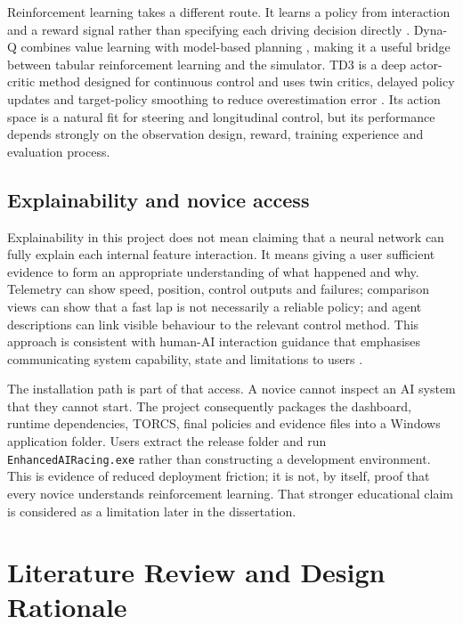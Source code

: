 Reinforcement learning takes a different route. It learns a policy from interaction and a reward signal rather than specifying each driving decision directly \parencite{suttonbarto2018}. Dyna-Q combines value learning with model-based planning \parencite{sutton1990}, making it a useful bridge between tabular reinforcement learning and the simulator. TD3 is a deep actor-critic method designed for continuous control and uses twin critics, delayed policy updates and target-policy smoothing to reduce overestimation error \parencite{fujimoto2018}. Its action space is a natural fit for steering and longitudinal control, but its performance depends strongly on the observation design, reward, training experience and evaluation process.

\subsection{Explainability and novice access}

Explainability in this project does not mean claiming that a neural network can fully explain each internal feature interaction. It means giving a user sufficient evidence to form an appropriate understanding of what happened and why. Telemetry can show speed, position, control outputs and failures; comparison views can show that a fast lap is not necessarily a reliable policy; and agent descriptions can link visible behaviour to the relevant control method. This approach is consistent with human-AI interaction guidance that emphasises communicating system capability, state and limitations to users \parencite{amershi2019}.

The installation path is part of that access. A novice cannot inspect an AI system that they cannot start. The project consequently packages the dashboard, runtime dependencies, TORCS, final policies and evidence files into a Windows application folder. Users extract the release folder and run \texttt{EnhancedAIRacing.exe} rather than constructing a development environment. This is evidence of reduced deployment friction; it is not, by itself, proof that every novice understands reinforcement learning. That stronger educational claim is considered as a limitation later in the dissertation.


\section{Literature Review and Design Rationale}
\label{ch:literature-review}


